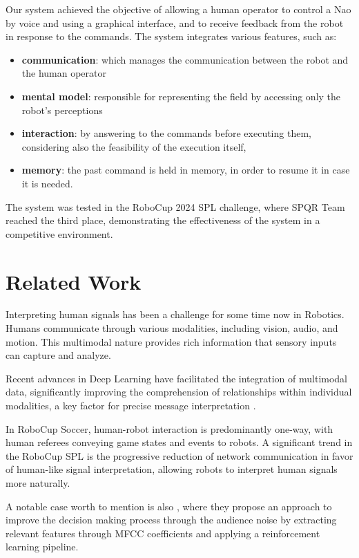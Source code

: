 \documentclass[a4paper, onecolumn, 12pt]{article}
\begin{document}
Our system achieved the objective of allowing a human operator to control a Nao
by voice and using a graphical interface, and to receive feedback from the robot
in response to the commands. The system integrates various features, such as:
\begin{itemize}
    \item \textbf{communication}: which manages the communication between the robot and
    the human operator
    \item \textbf{mental model}: responsible for representing the field by
    accessing only the robot's perceptions
    \item \textbf{interaction}: by answering to the commands before executing
    them, considering also the feasibility of the execution itself,
    \item \textbf{memory}: the past command is held in memory, in order to
    resume it in case it is needed.
\end{itemize}
The system was tested in the RoboCup 2024 SPL challenge, where SPQR Team reached
the third place, demonstrating the effectiveness of the system in a competitive
environment.

\newpage

\section{Related Work}
\label{sec:rel}

Interpreting human signals has been a challenge for some time now in Robotics.
Humans communicate through various modalities, including vision, audio, and
motion. This multimodal nature provides rich information that sensory inputs can
capture and analyze. 

Recent advances in Deep Learning have facilitated the
integration of multimodal data, significantly improving the comprehension of
relationships within individual modalities, a key factor for precise message
interpretation \cite{LIU20183} \cite{su2023recent}.

In RoboCup Soccer, human-robot interaction is predominantly one-way, with human
referees conveying game states and events to robots. A significant trend in the
RoboCup SPL is the progressive reduction of network communication in
favor of human-like signal interpretation, allowing robots to interpret human
signals more naturally. \cite{digiambattista}

A notable case worth to mention is also \cite{antonioni}, where they propose an
approach to improve the decision making process through the audience noise by
extracting relevant features through MFCC coefficients and applying a
reinforcement learning pipeline. 
\end{document}
